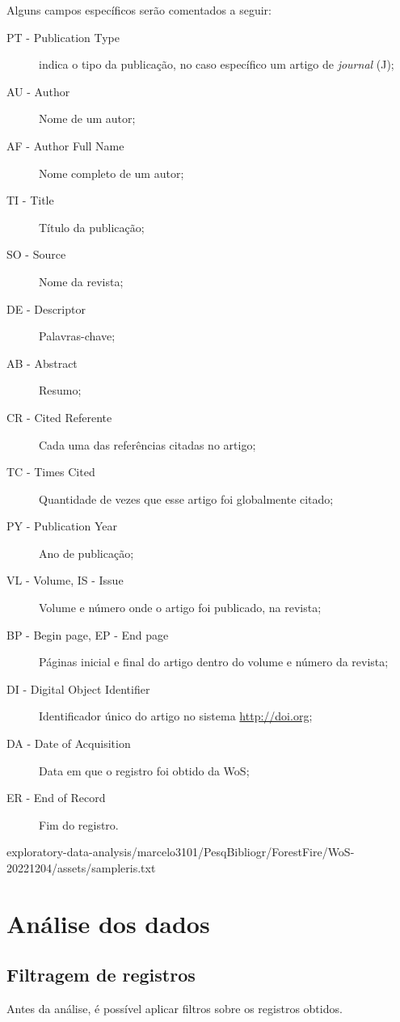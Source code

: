Alguns campos específicos serão comentados a seguir:
\begin{description}
    \item [PT - Publication Type] indica o tipo da publicação, no caso específico um artigo de \textit{journal} (J);
    \item [AU - Author] Nome de um autor;
    \item [AF - Author Full Name] Nome completo de um autor;
    \item [TI - Title] Título da publicação;
    \item [SO - Source] Nome da revista;
    \item [DE - Descriptor] Palavras-chave;
    \item [AB - Abstract] Resumo;
    \item [CR - Cited Referente] Cada uma das referências citadas no artigo;
    \item [TC - Times Cited] Quantidade de vezes que esse artigo foi globalmente citado;
    \item [PY - Publication Year] Ano de publicação;
    \item [VL - Volume, IS - Issue] Volume e número onde o artigo foi publicado, na revista;
    \item [BP - Begin page, EP - End page] Páginas inicial e final do artigo dentro do volume e número da revista;
    \item [DI - Digital Object Identifier] Identificador único do artigo no sistema \url{http://doi.org};
    \item [DA - Date of Acquisition] Data em que o registro foi obtido da WoS;
    \item [ER - End of Record] Fim do registro.
\end{description}


{exploratory-data-analysis/marcelo3101/PesqBibliogr/ForestFire/WoS-20221204/assets/sampleris.txt}

\section{Análise dos dados\label{FF@marcelo3101:analise}}

\subsection{Filtragem de registros}
Antes da análise, é possível aplicar filtros sobre os registros obtidos.

